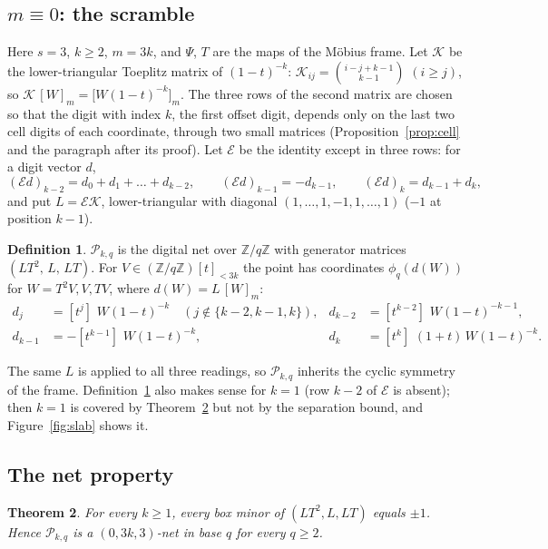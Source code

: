 \documentclass[11pt]{amsart}
\newtheorem{theorem}{Theorem}
\theoremstyle{definition}
\newtheorem{definition}[theorem]{Definition}
\theoremstyle{plain}
\newcommand{\Z}{\mathbb{Z}}
\newcommand{\coef}[1]{[t^{#1}]\,}
\begin{document}
\subsection{\texorpdfstring{$m\equiv0$}{m = 0}: the scramble}\label{sec:construction}
Here $s=3$, $k\ge2$, $m=3k$, and $\Psi$, $T$ are the maps of the M\"obius frame. Let $\mathcal K$ be the lower-triangular Toeplitz matrix of $(1-t)^{-k}$: $\mathcal K_{ij}=\binom{i-j+k-1}{k-1}$ $(i\ge j)$, so $\mathcal K\,[W]_m=\bigl[W(1-t)^{-k}\bigr]_m$. The three rows of the second matrix are chosen so that the digit with index $k$, the first offset digit, depends only on the last two cell digits of each coordinate, through two small matrices (Proposition~\ref{prop:cell} and the paragraph after its proof). Let $\mathcal E$ be the identity except in three rows: for a digit vector $d$,
\[
(\mathcal Ed)_{k-2}=d_0+d_1+\dots+d_{k-2},\qquad (\mathcal Ed)_{k-1}=-d_{k-1},\qquad (\mathcal Ed)_k=d_{k-1}+d_k,
\]
and put $L=\mathcal E\mathcal K$, lower-triangular with diagonal $(1,\dots,1,-1,1,\dots,1)$ ($-1$ at position $k-1$).

\begin{definition}\label{def:net}
$\mathcal P_{k,q}$ is the digital net over $\Z/q\Z$ with generator matrices $(LT^2,\,L,\,LT)$. For $V\in(\Z/q\Z)[t]_{<3k}$ the point has coordinates $\phi_q(d(W))$ for $W=T^2V,V,TV$, where $d(W)=L\,[W]_m$:
\begin{align*}
d_j&=\coef{j}\,W(1-t)^{-k}\quad(j\notin\{k-2,k-1,k\}),&
d_{k-2}&=\coef{k-2}\,W(1-t)^{-k-1},\\
d_{k-1}&=-\coef{k-1}\,W(1-t)^{-k},&
d_k&=\coef{k}\,(1+t)\,W(1-t)^{-k}.
\end{align*}
\end{definition}

The same $L$ is applied to all three readings, so $\mathcal P_{k,q}$ inherits the cyclic symmetry of the frame. Definition~\ref{def:net} also makes sense for $k=1$ (row $k-2$ of $\mathcal E$ is absent); then $k=1$ is covered by Theorem~\ref{thm:t0} but not by the separation bound, and Figure~\ref{fig:slab} shows it.

\subsection{The net property}
\begin{theorem}\label{thm:t0}
For every $k\ge1$, every box minor of $(LT^2,L,LT)$ equals $\pm1$. Hence $\mathcal P_{k,q}$ is a $(0,3k,3)$-net in base $q$ for every $q\ge2$.
\end{theorem}
\end{document}
